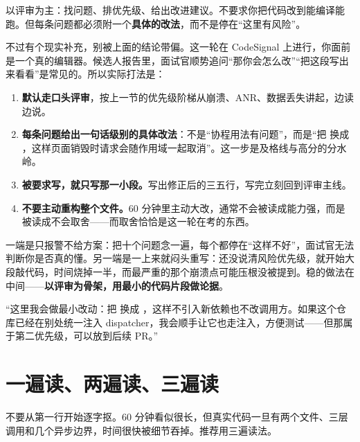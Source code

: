 \begin{keypoint}[一句话结论]
以评审为主：找问题、排优先级、给出改进建议。不要求你把代码改到能编译能跑。但每条问题都必须附一个\textbf{具体的改法}，而不是停在“这里有风险”。
\end{keypoint}

不过有个现实补充，别被上面的结论带偏。这一轮在 CodeSignal 上进行，你面前是一个真的编辑器。\srccommunity 候选人报告里，面试官顺势追问“那你会怎么改”“把这段写出来看看”是常见的。所以实际打法是：

\begin{enumerate}
  \item \textbf{默认走口头评审}，按上一节的优先级阶梯从崩溃、ANR、数据丢失讲起，边读边说。
  \item \textbf{每条问题给出一句话级别的具体改法}：不是“协程用法有问题”，而是“把  换成 ，这样页面销毁时请求会随作用域一起取消”。这一步是及格线与高分的分水岭。
  \item \textbf{被要求写，就只写那一小段。}写出修正后的三五行，写完立刻回到评审主线。
  \item \textbf{不要主动重构整个文件。}60 分钟里主动大改，通常不会被读成能力强，而是被读成不会取舍——而取舍恰恰是这一轮在考的东西。
\end{enumerate}

\begin{pitfall}[两种极端都会扣分]
一端是只报警不给方案：把十个问题念一遍，每个都停在“这样不好”，面试官无法判断你是否真的懂。另一端是一上来就闷头重写：还没说清风险优先级，就开始大段敲代码，时间烧掉一半，而最严重的那个崩溃点可能压根没被提到。稳的做法在中间——\textbf{以评审为骨架，用最小的代码片段做论据}。
\end{pitfall}

\begin{sayit}
“这里我会做最小改动：把  换成 ，这样不引入新依赖也不改调用方。如果这个仓库已经在别处统一注入 dispatcher，我会顺手让它也走注入，方便测试——但那属于第二优先级，可以放到后续 PR。”
\end{sayit}

\section{一遍读、两遍读、三遍读}

不要从第一行开始逐字抠。60 分钟看似很长，但真实代码一旦有两个文件、三层调用和几个异步边界，时间很快被细节吞掉。推荐用三遍读法。

